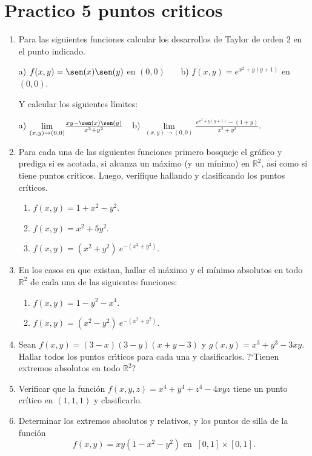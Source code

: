 \documentclass[11pt]{book}
\newcommand{\R}{\mathbb{R}}
\theoremstyle{definicion}
\theoremstyle{teorema}
\theoremstyle{ejemplo}
\begin{document}
\section{Practico 5 puntos criticos}

\begin{enumerate}

\item Para las siguientes funciones calcular los desarrollos de Taylor de orden 2 en el punto indicado.

a) $f(x,y)=\sen(x)\sen(y)$ en $(0,0)$  \ \ \  b) $f(x,y)=e^{x^2+y(y+1)}$ en $(0,0)$.

Y calcular los siguientes l\'imites:

a) $\underset{\left( x,y\right) \rightarrow \left( 0,0\right) }{\lim}\frac{xy-\sen(x)\sen(y)}{x^2+y^2}$\ \ 
b) $\underset{\left( x,y\right) \rightarrow \left( 0,0\right) }{\lim}\frac{e^{x^2+y(y+1)}-(1 + y)}{x^2+y^2}$.


\item
Para cada una de las siguientes funciones primero bosqueje el gráfico y prediga si es acotada, si alcanza un máximo (y un mínimo) en $\R^2$, así como si tiene puntos críticos. Luego, verifique hallando y clasificando los puntos críticos.
\begin{enumerate}
\item $f(x,y)=1+x^2 -y^2$.
\item $f(x,y)=x^2 + 5y^2$.
\item  $f(x,y)=\left( x^2+y^2 \right) \ e^{-(x^2+y^2)}$.

\end{enumerate}

\item
En los casos en que existan, hallar el m\'{a}ximo y el mínimo absolutos en todo $\R^2$
de cada una de las siguientes funciones:
\begin{enumerate}
\item  $f(x,y)=1-y^2-x^4$.
\item  $f(x,y)=\left( x^2-y^2 \right) \ e^{-(x^2+y^2)}$.
\end{enumerate}

\item  
Sean $f(x,y)=(3-x)(3-y)(x+y-3)$ y $g(x,y)=x^3 +y^3 -3xy$. Hallar todos los puntos cr\'\i ticos para cada una y
clasificarlos. ?`Tienen extremos absolutos en todo $\R^2$?

\item  
Verificar que la funci\'on $f(x,y,z)=x^4 + y^4 +z^4 -4xyz$ tiene un
punto crítico en $(1,1,1)$ y clasificarlo.%

\item 
Determinar los extremos absolutos y relativos, y los puntos de silla de la funci\'on
\begin{equation*}
f(x,y)=xy(1-x^2-y^2) \text{ en }\  [0,1]\times [0,1].
\end{equation*}


\end{enumerate}
\end{document}
